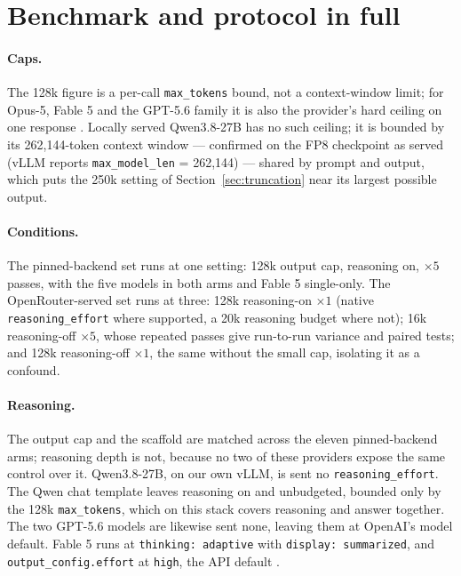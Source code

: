 \documentclass{article}
\begin{document}



\appendix

\section{Benchmark and protocol in full}
\label{app:protocol}

\paragraph{Caps.} The 128k figure is a per-call \texttt{max\_tokens} bound, not a context-window
limit; for Opus-5, Fable 5 and the GPT-5.6 family it is also the provider's hard ceiling on one
response \citep{anthropic2026,openai2026}. Locally served Qwen3.8-27B has no such ceiling; it is
bounded by its 262{,}144-token context window \citep{qwen2026c} --- confirmed on the FP8 checkpoint
as served (vLLM reports \texttt{max\_model\_len} = 262{,}144) --- shared by prompt and output,
which puts the 250k setting of Section~\ref{sec:truncation} near its largest possible output.

\paragraph{Conditions.} The pinned-backend set runs at one setting: 128k output cap, reasoning on,
$\times 5$ passes, with the five models in both arms and Fable 5 single-only. The
OpenRouter-served set runs at three: 128k reasoning-on $\times 1$ (native
\texttt{reasoning\_effort} where supported, a 20k reasoning budget where not); 16k reasoning-off
$\times 5$, whose repeated passes give run-to-run variance and paired tests; and 128k reasoning-off
$\times 1$, the same without the small cap, isolating it as a confound.

\paragraph{Reasoning.} The output cap and the scaffold are matched across the eleven pinned-backend
arms; reasoning depth is not, because no two of these providers expose the same control over it.
Qwen3.8-27B, on our own vLLM, is sent no \texttt{reasoning\_effort}. The Qwen chat template
leaves reasoning on and unbudgeted, bounded only by the 128k \texttt{max\_tokens}, which on this
stack covers reasoning and answer together. The two GPT-5.6 models are likewise sent none, leaving
them at OpenAI's model default. Fable 5 runs at \texttt{thinking: adaptive} with \texttt{display:
summarized}, and \texttt{output\_config.effort} at \texttt{high}, the API default
\citep{anthropic2026effort}.
\end{document}
